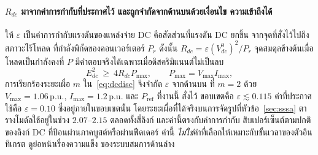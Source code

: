 \documentclass[12pt,a4paper]{article}
\newcommand{\pu}{\,\mathrm{p.u.}}
\begin{document}
\paragraph{$R_{dc}$ มาจากค่าการกำกับที่ประกาศไว้ และถูกจำกัดจากด้านบนด้วยเงื่อนไข
ความเข้าถึงได้}
ให้ $\varepsilon$ เป็นค่าการกำกับแรงดันของแหล่งจ่าย DC คือสัดส่วนที่แรงดัน DC ยกขึ้น
จากจุดที่สั่งไว้ไปถึงสภาวะไร้โหลด ที่กำลังพิกัดของคอนเวอร์เตอร์ $P_r$ ดังนั้น
$R_{dc}=\varepsilon (V_{dc}^{0})^{2}/P_r$ จุดสมดุลข้างต้นเมื่อโหลดเป็นกำลังคงที่ $P$
มีคำตอบจริงได้เฉพาะเมื่อดิสคริมิแนนต์ไม่เป็นลบ
\begin{equation}
  E_{dc}^{2}\ \ge\ 4R_{dc}P_{\max},\qquad P_{\max}=V_{\max}I_{\max},
  \label{eq:dcdisc}
\end{equation}
การเรียกร้องระยะเผื่อ $m$ ใน~\eqref{eq:dcdisc} จึงจำกัด $\varepsilon$ จากด้านบน ที่
$m=2$ ด้วย $V_{\max}=1.06\pu$, $I_{\max}=1.2\pu$ และ $P_{\mathrm{ref}}$ ที่งานนี้
สั่งไว้ ขอบเขตคือ $\varepsilon\lesssim0.115$ ค่าที่ประกาศใช้คือ $\varepsilon=0.10$
ซึ่งอยู่ภายในขอบเขตนั้น โดยระยะเผื่อที่ได้จริงบนการจัดรูปที่หัวข้อ~\ref{sec:sssa}
ตารางโมดัลใช้อยู่ในช่วง $2.07$--$2.15$ ตลอดทั้งสี่ลิงก์ และค่านี้ตรงกับค่าการกำกับ
สิบเปอร์เซ็นต์ตามปกติของลิงก์ DC ที่ป้อนผ่านภาคบูสต์หรือผ่านฟีดเดอร์ ค่านี้
\emph{ไม่ใช่}ค่าที่เลือกให้เหมาะกับขั้นเวลาของตัวอินทิเกรต ดูย่อหน้าเรื่องความแข็ง
ของระบบสมการด้านล่าง
\end{document}
